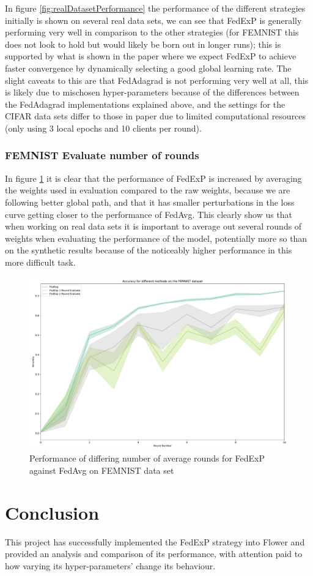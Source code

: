 \documentclass{article}
\begin{document}
In figure \ref{fig:realDatasetPerformance} the performance of the different strategies initially is shown on several real data sets, we can see that FedExP is generally performing very well in comparison to the other strategies (for FEMNIST this does not look to hold but would likely be born out in longer runs); this is supported by what is shown in the paper where we expect FedExP to achieve faster convergence by dynamically selecting a good global learning rate.  The slight caveats to this are that FedAdagrad is not performing very well at all, this is likely due to mischosen hyper-parameters because of the differences between the FedAdagrad implementations explained above, and the settings for the CIFAR data sets differ to those in paper due to limited computational resources (only using 3 local epochs and 10 clients per round).

\subsubsection{FEMNIST Evaluate number of rounds}

In figure \ref{fig:femnistDifferentNumberOfEvaluateRounds} it is clear that the performance of FedExP is increased by averaging the weights used in evaluation compared to the raw weights, because we are following better global path, and that it has smaller perturbations in the loss curve getting closer to the performance of FedAvg.  This clearly show us that when working on real data sets it is important to average out several rounds of weights when evaluating the performance of the model, potentially more so than on the synthetic results because of the noticeably higher performance in this more difficult task.

\begin{figure}
    \centerline{\includegraphics[width=.6\linewidth]{figs/femnist_fedexp_fedavg_evaluateRounds.pdf}}
    \caption{Performance of differing number of average rounds for FedExP against FedAvg on FEMNIST data set}
    \label{fig:femnistDifferentNumberOfEvaluateRounds}
\end{figure}

\section{Conclusion}

This project has successfully implemented the FedExP strategy into Flower and provided an analysis and comparison of its performance, with attention paid to how varying its hyper-parameters' change its behaviour.


\end{document}
